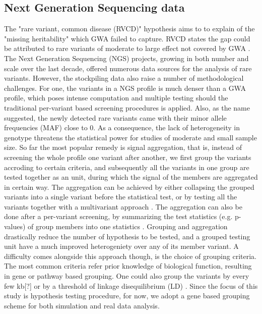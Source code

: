 \subsection{Next Generation Sequencing data}
The "rare variant, common disease (RVCD)" hypothesis aims to to explain of the "missing heritability" which GWA failed to capture. RVCD states the gap could be attributed to rare variants of moderate to large effect not covered by GWA \cite{RVCD1}. The Next Generation Sequencing (NGS) projects, growing in both number and scale over the last decade, offered numerous data sources for the analysis of rare variants. However, the stockpiling data also raise a number of methodological challenges. For one, the variants in a NGS profile is much denser than a GWA profile, which poses intense computation and multiple testing should the traditional per-variant based screening procedures is applied. Also, as the name suggested, the newly detected rare variants came with their minor allele frequencies (MAF) close to 0. As a consequence, the lack of heterogeneity in genotype threatens the statistical power for studies of moderate and small sample size. So far the most popular remedy is signal aggregation, that is, instead of screening the whole profile one variant after another, we first group the variants accroding to certain criteria, and subsequently all the variants in one group are tested together as an unit, during which the signal of the members are aggregated in certain way. The aggregation can be achieved by either collapsing the grouped variants into a single variant \cite{Burden1} before the statistical test, or by testing all the variants together with a multivariant approach \cite{HWU, SKT}. The aggregation can also be done after a per-variant screening, by summarizing the test statistics (e.g. p-values) of group members into one statistics \cite{Dai:2015, plink1}. Grouping and aggregation drastically reduce the number of hypothesis to be tested, and a grouped testing unit have a much improved heterogeniety over any of its member variant. A difficulty comes alongside this approach though, is the choice of grouping criteria. The most common criteria refer prior knowledge of biological function, resulting in gene or pathway based grouping. One could also group the variants by every few kb[?] or by a threshold of linkage disequilibrium (LD) \cite{plink1}. Since the focus of this study is hypothesis testing procedure, for now, we adopt a gene based grouping scheme for both simulation and real data analysis.

